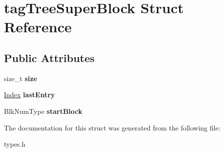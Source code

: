 \hypertarget{structtagTreeSuperBlock}{}\section{tag\+Tree\+Super\+Block Struct Reference}
\label{structtagTreeSuperBlock}
\subsection*{Public Attributes}
\begin{DoxyCompactItemize}
\item 
\mbox{\label{structtagTreeSuperBlock_a5fba4a1328640e6b41f4c3e8ca7ee804}} 
size\+\_\+t {\bfseries size}
\item 
\mbox{\label{structtagTreeSuperBlock_ac2492d025873ac0d95921ee91acabe51}} 
\mbox{\hyperlink{structindex}{Index}} {\bfseries last\+Entry}
\item 
\mbox{\label{structtagTreeSuperBlock_ad7f50abf9a6efeee63037e73d0c349d9}} 
Blk\+Num\+Type {\bfseries start\+Block}
\end{DoxyCompactItemize}


The documentation for this struct was generated from the following file\+:\begin{DoxyCompactItemize}
\item 
types.\+h\end{DoxyCompactItemize}
